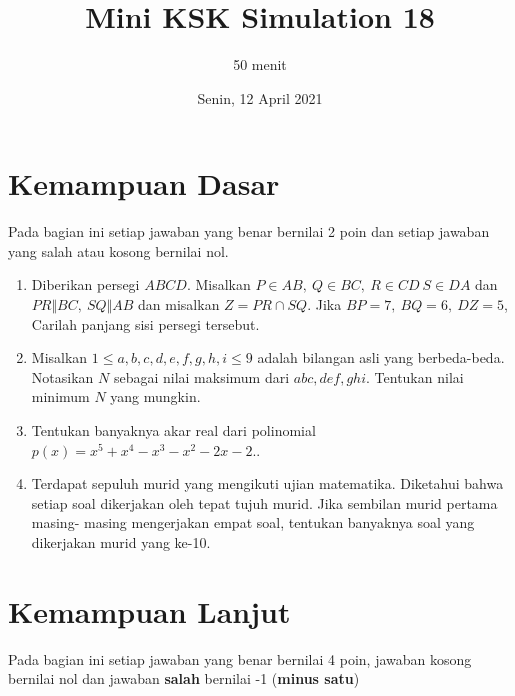 \documentclass{article}
\title{Mini KSK Simulation 18}
\author{50 menit}
\date{Senin, 12 April 2021}
\begin{document}
	\maketitle
	
	\section{Kemampuan Dasar}
	Pada bagian ini setiap jawaban yang benar bernilai 2 poin dan setiap jawaban yang salah
	atau kosong bernilai nol.
	\begin{enumerate}
		\item Diberikan persegi $ABCD$. Misalkan $P\in{AB},\ Q\in{BC},\ R\in{CD}\ S\in{DA}$ dan $PR\Vert BC,\ SQ\Vert AB$ dan misalkan $Z=PR\cap SQ$. Jika $BP=7,\ BQ=6,\ DZ=5$, Carilah panjang sisi persegi tersebut.
		
		\item Misalkan $1 \le a,b,c,d,e,f,g,h,i \le 9$ adalah bilangan asli yang berbeda-beda. Notasikan $N$ sebagai nilai maksimum dari $abc, def, ghi$. Tentukan nilai minimum $N$ yang mungkin.
		
		\item
		Tentukan banyaknya akar real dari polinomial $p(x)=x^5+x^4-x^3-x^2-2x-2.$.
		
		\item Terdapat sepuluh murid yang mengikuti ujian matematika. Diketahui bahwa setiap soal dikerjakan oleh tepat tujuh murid. Jika sembilan murid pertama masing-
		masing mengerjakan empat soal, tentukan banyaknya soal yang dikerjakan murid yang ke-10.
	\end{enumerate}

\section{Kemampuan Lanjut}
Pada bagian ini setiap jawaban yang benar bernilai 4 poin, jawaban kosong bernilai nol
dan jawaban \textbf{salah} bernilai -1 (\textbf{minus satu})
\end{document}
